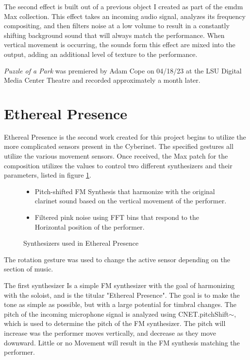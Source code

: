 The second effect is built out of a previous object I created as part of the emdm Max collection. This effect takes an incoming audio signal, analyzes its frequency compositing, and then filters noise at a low volume to result in a constantly shifting background sound that will always match the performance. When vertical movement is occurring, the sounds form this effect are mixed into the output, adding an additional level of texture to the performance.

\textit{Puzzle of a Park} was premiered by Adam Cope on 04/18/23 at the LSU Digital Media Center Theatre and recorded approximately a month later.

\section{Ethereal Presence}
Ethereal Presence is the second work created for this project begins to utilize the more complicated sensors present in the Cyberinet. The specified gestures all utilize the various movement sensors. Once received, the Max patch for the composition utilizes the values to control two different synthesizers and their parameters, listed in figure \ref{fig:etherealSynths}. 

\begin{figure}
    \centering
\begin{itemize}
    \item Pitch-shifted FM Synthesis that harmonize with the original clarinet sound based on the vertical movement of the performer.
    \item Filtered pink noise using FFT bins that respond to the Horizontal position of the performer.
\end{itemize}
    \caption{Synthesizers used in Ethereal Presence}
    \label{fig:etherealSynths}
\end{figure}

The rotation gesture was used to change the active sensor depending on the section of music.

The first synthesizer Is a simple FM synthesizer with the goal of harmonizing with the soloist, and is the titular "Ethereal Presence". The goal is to make the tone as simple as possible, but with a large potential for timbral changes. The pitch of the incoming microphone signal is analyzed using CNET.pitchShift$\sim$, which is used to determine the pitch of the FM synthesizer. The pitch will increase was the performer moves vertically, and decrease as they move downward. Little or no Movement will result in the FM synthesis matching the performer.

